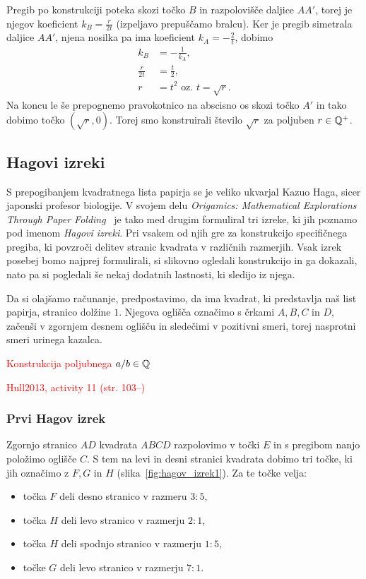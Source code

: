 Pregib po konstrukciji poteka skozi točko $B$ in razpolovišče daljice $AA'$, torej je njegov koeficient $k_B = \frac{r}{2t}$ (izpeljavo prepuščamo bralcu). Ker je pregib simetrala daljice $AA'$, njena nosilka pa ima koeficient $k_A = - \frac{2}{t}$, dobimo
\begin{align*}
    k_B &= - \frac{1}{k_A},\\
    \frac{r}{2t} &= \frac{t}{2},\\
    r &= t^2 \text{ oz. } t = \sqrt{r}.
\end{align*}
Na koncu le še prepognemo pravokotnico na abscisno os skozi točko $A'$ in tako dobimo točko $(\sqrt{r}, 0)$. Torej smo konstruirali število $\sqrt{r}$ za poljuben $r \in \mathbb Q^{+}$.

\subsection{Hagovi izreki}

S prepogibanjem kvadratnega lista papirja se je veliko ukvarjal Kazuo Haga, sicer japonski profesor biologije. V svojem delu \emph{Origamics: Mathematical Explorations Through Paper Folding}~\cite{haga2008} je tako med drugim formuliral tri izreke, ki jih poznamo pod imenom \emph{Hagovi izreki}. Pri vsakem od njih gre za konstrukcijo specifičnega pregiba, ki povzroči delitev stranic kvadrata v različnih razmerjih. Vsak izrek posebej bomo najprej formulirali, si slikovno ogledali konstrukcijo in ga dokazali, nato pa si pogledali še nekaj dodatnih lastnosti, ki sledijo iz njega.

Da si olajšamo računanje, predpostavimo, da ima kvadrat, ki predstavlja naš list papirja, stranico dolžine $1$. Njegova oglišča označimo s črkami $A, B, C$ in $D$, začenši v zgornjem desnem oglišču in sledečimi v pozitivni smeri, torej nasprotni smeri urinega kazalca.

\textcolor{red}{Konstrukcija poljubnega $a/b \in \mathbb Q$~\cite[str.\ 20--21]{lang2013}}

\textcolor{red}{Hull2013, activity 11 (str. 103--)}

\subsubsection{Prvi Hagov izrek}

\begin{izrek}
    Zgornjo stranico $AD$ kvadrata $ABCD$ razpolovimo v točki $E$ in s pregibom nanjo položimo oglišče $C$. S tem na levi in desni stranici kvadrata dobimo tri točke, ki jih označimo z $F, G$ in $H$ (slika~\ref{fig:hagov_izrek1}). Za te točke velja:
    \begin{itemize}
        \item točka $F$ deli desno stranico v razmeru $3:5$,
        \item točka $H$ deli levo stranico v razmerju $2:1$,
        \item točka $H$ deli spodnjo stranico v razmerju $1:5$,
        \item točke $G$ deli levo stranico v razmerju $7:1$.
    \end{itemize}
\end{izrek}

